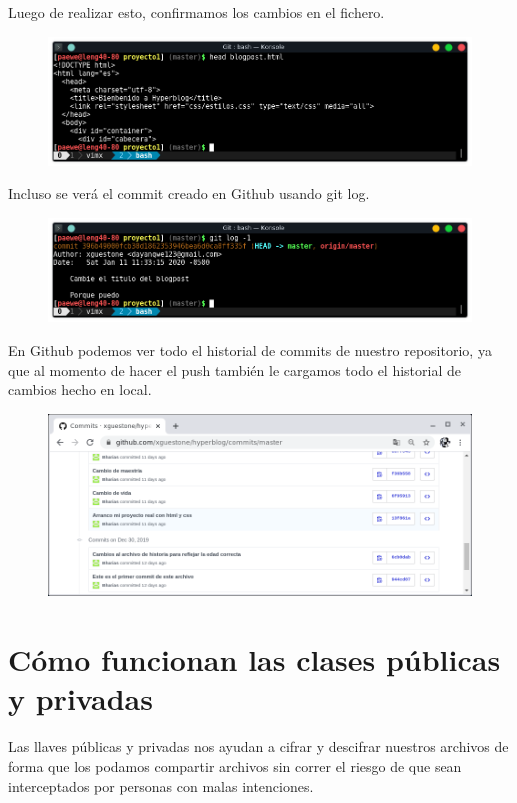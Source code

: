 \documentclass{article}
\begin{document}
Luego de realizar esto, confirmamos los cambios en el fichero.

\newpage

\begin{figure}[h!]
  \centering
  \includegraphics[scale=0.75]{./Pictures/207_local_repo_changed.png}
\end{figure}

Incluso se verá el commit creado en Github usando git log.

\begin{figure}[h!]
  \centering
  \includegraphics[scale=0.75]{./Pictures/208_last_commit.png}
\end{figure}

En Github podemos ver todo el historial de commits de nuestro repositorio, ya
que al momento de hacer el push también le cargamos todo el historial de
cambios hecho en local.

\begin{figure}[h!]
  \centering
  \includegraphics[scale=0.75]{./Pictures/209_commits_github.png}
\end{figure}


\newpage

\section{Cómo funcionan las clases públicas y privadas}%
Las llaves públicas y privadas nos ayudan a cifrar y descifrar nuestros
archivos de forma que los podamos compartir archivos sin correr el riesgo de
que sean interceptados por personas con malas intenciones.\\
\end{document}
